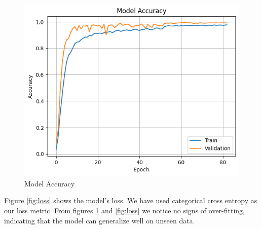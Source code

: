 \begin{enumerate}
\begin{figure}
\centering
\includegraphics[]{acc.png}
\caption{Model Accuracy}
\label{fig:acc}
\end{figure}

Figure \ref{fig:loss} shows the model's loss. We have used categorical cross entropy as our loss metric. From figures \ref{fig:acc}  and \ref{fig:loss} we notice no signs of over-fitting, indicating that the model can generalize well on unseen data.


\end{enumerate}
